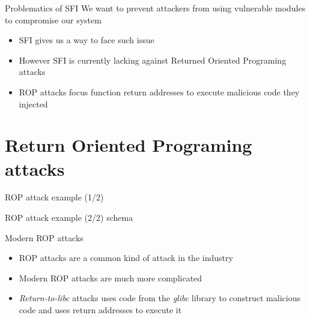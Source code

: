 \documentclass{beamer}
\begin{document}
\begin{frame}[c]{Problematics of SFI}
We want to prevent attackers from using vulnerable modules to compromise our system
	\begin{itemize}
		\item SFI gives us a way to face such issue
		\item However SFI is currently lacking against Returned Oriented Programing attacks
		\item ROP attacks focus function return addresses to execute malicious code they injected
	\end{itemize}
	
\end{frame}

\section{Return Oriented Programing attacks}
\label{sec:Return Oriented Programing attacks}


\begin{frame}{ROP attack example (1/2)}
	\Buffer
\end{frame}

\begin{frame}[c]{ROP attack example (2/2)}
 schema	
\end{frame}

\begin{frame}[c]{Modern ROP attacks}
\begin{itemize}
	\item ROP attacks are a common kind of attack in the industry
	\item Modern ROP attacks are much more complicated 
	\item \textit{Return-to-libc} attacks uses code from the \textit{glibc} library to construct malicious code and uses return addresses to execute it
\end{itemize}
\end{frame}
\end{document}
